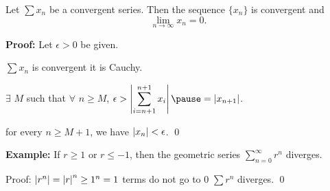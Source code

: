 \documentclass[10pt,aspectratio=149]{beamer}
\begin{document}
\begin{frame}

\begin{proposition}
Let $\sum x_n$ be a convergent series.  Then
the sequence $\{ x_n \}$ is convergent and
\begin{equation*}
\lim_{n\to\infty} x_n = 0.
\end{equation*}
\end{proposition}

\pause
\textbf{Proof:}
Let $\epsilon > 0$ be given.

\pause
\medskip

$\sum x_n$ is convergent \wthus it is Cauchy.

\pause
\medskip

$\exists$ $M$ such that $\forall$ $n \geq M$, \quad
$\displaystyle
\epsilon > 
\abs{ \sum_{i={n+1}}^{n+1} x_i }
\pause
=
\abs{ x_{n+1} }$.

\pause
\medskip

\thus \quad for every $n \geq M+1$, we have $\left\lvert {x_{n}} \right\rvert < \epsilon$.
\qed

\pause
\medskip

\textbf{Example:}
If $r \geq 1$ or $r \leq -1$, then the geometric series $\sum_{n=0}^\infty r^n$
diverges.

\pause
\medskip

Proof:
$\left\lvert {r^n} \right\rvert = \left\lvert {r} \right\rvert^n \geq 1^n = 1$ 
\pause
\wthus terms do not go to 0
\pause
\wthus
$\sum r^n$ diverges.
\qed

\end{frame}
\end{document}
